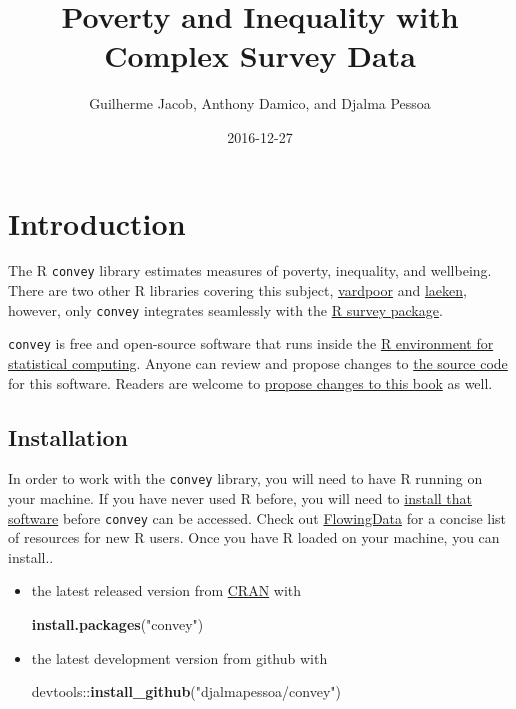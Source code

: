 \documentclass[]{book}
\title{Poverty and Inequality with Complex Survey Data}
\author{Guilherme Jacob, Anthony Damico, and Djalma Pessoa}
\date{2016-12-27}
\newenvironment{Shaded}{\begin{snugshade}}{\end{snugshade}}
\newcommand{\KeywordTok}[1]{\textcolor[rgb]{0.13,0.29,0.53}{\textbf{{#1}}}}
\newcommand{\StringTok}[1]{\textcolor[rgb]{0.31,0.60,0.02}{{#1}}}
\newcommand{\NormalTok}[1]{{#1}}
\begin{document}
\maketitle

{
\setcounter{tocdepth}{1}
\tableofcontents
}
\chapter{Introduction}\label{introduction}

The R \texttt{convey} library estimates measures of poverty, inequality,
and wellbeing. There are two other R libraries covering this subject,
\href{https://CRAN.R-project.org/package=vardpoor}{vardpoor} and
\href{https://CRAN.R-project.org/package=laeken}{laeken}, however, only
\texttt{convey} integrates seamlessly with the
\href{https://CRAN.R-project.org/package=survey}{R survey package}.

\texttt{convey} is free and open-source software that runs inside the
\href{https://www.r-project.org/}{R environment for statistical
computing}. Anyone can review and propose changes to
\href{https://github.com/DjalmaPessoa/convey}{the source code} for this
software. Readers are welcome to
\href{https://github.com/guilhermejacob/context/}{propose changes to
this book} as well.

\section{Installation}\label{install}

In order to work with the \texttt{convey} library, you will need to have
R running on your machine. If you have never used R before, you will
need to \href{https://www.r-project.org/}{install that software} before
\texttt{convey} can be accessed. Check out
\href{http://flowingdata.com/2012/06/04/resources-for-getting-started-with-r/}{FlowingData}
for a concise list of resources for new R users. Once you have R loaded
on your machine, you can install..

\begin{itemize}
\item
  the latest released version from
  \href{https://CRAN.R-project.org/package=convey}{CRAN} with

\begin{Shaded}
\begin{Highlighting}[]
\KeywordTok{install.packages}\NormalTok{(}\StringTok{"convey"}\NormalTok{)}
\end{Highlighting}
\end{Shaded}
\item
  the latest development version from github with

\begin{Shaded}
\begin{Highlighting}[]
\NormalTok{devtools::}\KeywordTok{install_github}\NormalTok{(}\StringTok{"djalmapessoa/convey"}\NormalTok{)}
\end{Highlighting}
\end{Shaded}
\end{itemize}
\end{document}
